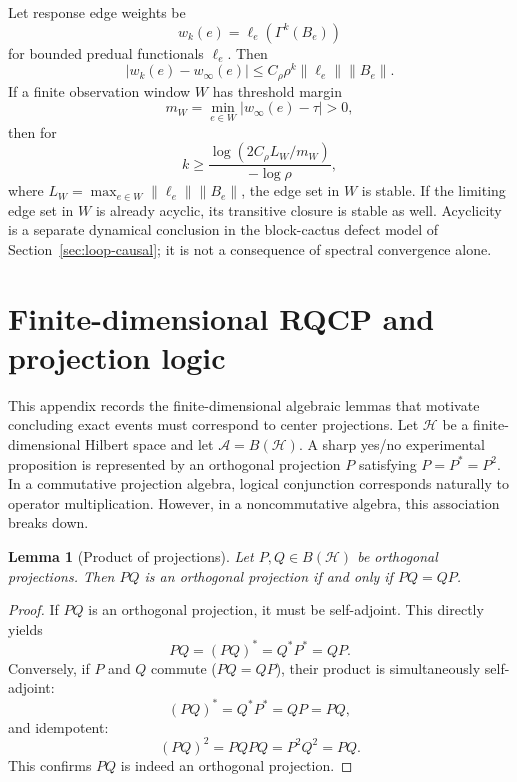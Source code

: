 \documentclass[11pt]{article}
\newtheorem{lemma}[theorem]{Lemma}
\newcommand{\A}{\mathcal A}
\newcommand{\Hh}{\mathcal H}
\begin{document}
Let response edge weights be
\[
w_k(e)=\ell_e(\Gamma^k(B_e))
\]
for bounded predual functionals $\ell_e$.  Then
\[
|w_k(e)-w_\infty(e)|\le C_\rho\rho^k\|\ell_e\|\|B_e\|.
\]
If a finite observation window $W$ has threshold margin
\[
m_W=\min_{e\in W}|w_\infty(e)-\tau|>0,
\]
then for
\[
k\ge \frac{\log(2C_\rho L_W/m_W)}{-\log\rho},
\]
where $L_W=\max_{e\in W}\|\ell_e\|\|B_e\|$, the edge set in $W$ is stable.
If the limiting edge set in \(W\) is already acyclic, its transitive closure
is stable as well.  Acyclicity is a separate dynamical conclusion in the
block-cactus defect model of Section~\ref{sec:loop-causal}; it is not a
consequence of spectral convergence alone.







\appendix
\clearpage
\section{Finite-dimensional RQCP and projection logic}\label{app:finite}

This appendix records the finite-dimensional algebraic lemmas that motivate concluding exact events must correspond to center projections. Let $\Hh$ be a finite-dimensional Hilbert space and let $\A=B(\Hh)$. A sharp yes/no experimental proposition is represented by an orthogonal projection $P$ satisfying $P=P^*=P^2$. In a commutative projection algebra, logical conjunction corresponds naturally to operator multiplication. However, in a noncommutative algebra, this association breaks down.

\begin{lemma}[Product of projections]\label{lem:projection-product}
Let $P,Q\in B(\Hh)$ be orthogonal projections. Then $PQ$ is an orthogonal projection if and only if $PQ=QP$.
\end{lemma}

\begin{proof}
If $PQ$ is an orthogonal projection, it must be self-adjoint. This directly yields
\[
PQ=(PQ)^*=Q^*P^*=QP.
\]
Conversely, if $P$ and $Q$ commute ($PQ=QP$), their product is simultaneously self-adjoint:
\[
(PQ)^*=Q^*P^*=QP=PQ,
\]
and idempotent:
\[
(PQ)^2=PQPQ=P^2Q^2=PQ.
\]
This confirms $PQ$ is indeed an orthogonal projection.
\end{proof}
\end{document}
